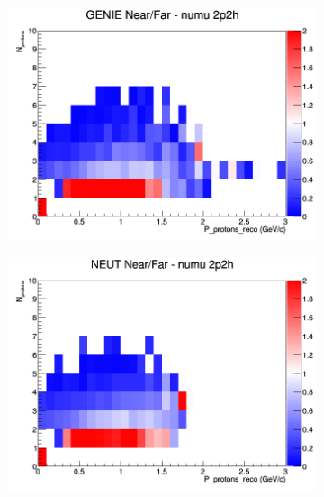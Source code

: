 \documentclass[12pt]{article}
\begin{document}
\begin{figure}[h]
\centering
\begin{subfigure}[b]{0.32\textwidth}
\includegraphics[width=\linewidth]{eff_N_P/FGT/protons/ratios/2p2h_GENIE_numu_NF_N_P.png}
\end{subfigure}
\begin{subfigure}[b]{0.32\textwidth}
\includegraphics[width=\linewidth]{eff_N_P/FGT/protons/ratios/2p2h_NEUT_numu_NF_N_P.png}
\end{subfigure}
\begin{subfigure}[b]{0.32\textwidth}

\end{subfigure}
\end{figure}
\end{document}
